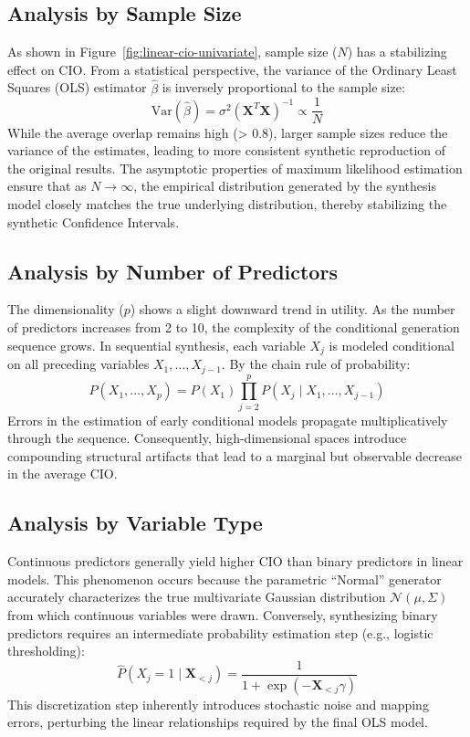\subsection{Analysis by Sample Size}
As shown in Figure~\ref{fig:linear-cio-univariate}, sample size ($N$) has a stabilizing effect on CIO. From a statistical perspective, the variance of the Ordinary Least Squares (OLS) estimator $\hat{\beta}$ is inversely proportional to the sample size:
\begin{equation}
    \text{Var}(\hat{\beta}) = \sigma^2 (\mathbf{X}^T \mathbf{X})^{-1} \propto \frac{1}{N}
\end{equation}
While the average overlap remains high (> 0.8), larger sample sizes reduce the variance of the estimates, leading to more consistent synthetic reproduction of the original results. The asymptotic properties of maximum likelihood estimation ensure that as $N \to \infty$, the empirical distribution generated by the synthesis model closely matches the true underlying distribution, thereby stabilizing the synthetic Confidence Intervals.

\subsection{Analysis by Number of Predictors}
The dimensionality ($p$) shows a slight downward trend in utility. As the number of predictors increases from 2 to 10, the complexity of the conditional generation sequence grows. In sequential synthesis, each variable $X_j$ is modeled conditional on all preceding variables $X_1, \dots, X_{j-1}$. By the chain rule of probability:
\begin{equation}
    P(X_1, \dots, X_p) = P(X_1) \prod_{j=2}^{p} P(X_j \mid X_1, \dots, X_{j-1})
\end{equation}
Errors in the estimation of early conditional models propagate multiplicatively through the sequence. Consequently, high-dimensional spaces introduce compounding structural artifacts that lead to a marginal but observable decrease in the average CIO.

\subsection{Analysis by Variable Type}
Continuous predictors generally yield higher CIO than binary predictors in linear models. This phenomenon occurs because the parametric ``Normal'' generator accurately characterizes the true multivariate Gaussian distribution $\mathcal{N}(\mu, \Sigma)$ from which continuous variables were drawn. Conversely, synthesizing binary predictors requires an intermediate probability estimation step (e.g., logistic thresholding):
\begin{equation}
    \hat{P}(X_j=1 \mid \mathbf{X}_{<j}) = \frac{1}{1 + \exp(-\mathbf{X}_{<j} \gamma)}
\end{equation}
This discretization step inherently introduces stochastic noise and mapping errors, perturbing the linear relationships required by the final OLS model.

